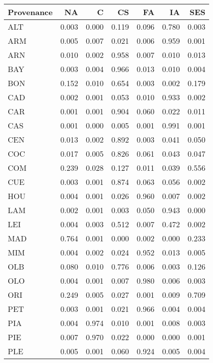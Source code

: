 \begin{table}[ht]
\centering
\begin{tabular}{lrrrrrr}
  \hline
Provenance & NA & C & CS & FA & IA & SES \\ 
  \hline
ALT & 0.003 & 0.000 & 0.119 & 0.096 & 0.780 & 0.003 \\ 
  ARM & 0.005 & 0.007 & 0.021 & 0.006 & 0.959 & 0.001 \\ 
  ARN & 0.010 & 0.002 & 0.958 & 0.007 & 0.010 & 0.013 \\ 
  BAY & 0.003 & 0.004 & 0.966 & 0.013 & 0.010 & 0.004 \\ 
  BON & 0.152 & 0.010 & 0.654 & 0.003 & 0.002 & 0.179 \\ 
  CAD & 0.002 & 0.001 & 0.053 & 0.010 & 0.933 & 0.002 \\ 
  CAR & 0.001 & 0.001 & 0.904 & 0.060 & 0.022 & 0.011 \\ 
  CAS & 0.001 & 0.000 & 0.005 & 0.001 & 0.991 & 0.001 \\ 
  CEN & 0.013 & 0.002 & 0.892 & 0.003 & 0.041 & 0.050 \\ 
  COC & 0.017 & 0.005 & 0.826 & 0.061 & 0.043 & 0.047 \\ 
  COM & 0.239 & 0.028 & 0.127 & 0.011 & 0.039 & 0.556 \\ 
  CUE & 0.003 & 0.001 & 0.874 & 0.063 & 0.056 & 0.002 \\ 
  HOU & 0.004 & 0.001 & 0.026 & 0.960 & 0.007 & 0.002 \\ 
  LAM & 0.002 & 0.001 & 0.003 & 0.050 & 0.943 & 0.000 \\ 
  LEI & 0.004 & 0.003 & 0.512 & 0.007 & 0.472 & 0.002 \\ 
  MAD & 0.764 & 0.001 & 0.000 & 0.002 & 0.000 & 0.233 \\ 
  MIM & 0.004 & 0.002 & 0.024 & 0.952 & 0.013 & 0.005 \\ 
  OLB & 0.080 & 0.010 & 0.776 & 0.006 & 0.003 & 0.126 \\ 
  OLO & 0.004 & 0.001 & 0.007 & 0.980 & 0.006 & 0.003 \\ 
  ORI & 0.249 & 0.005 & 0.027 & 0.001 & 0.009 & 0.709 \\ 
  PET & 0.003 & 0.001 & 0.021 & 0.966 & 0.004 & 0.004 \\ 
  PIA & 0.004 & 0.974 & 0.010 & 0.001 & 0.008 & 0.003 \\ 
  PIE & 0.007 & 0.970 & 0.022 & 0.000 & 0.000 & 0.001 \\ 
  PLE & 0.005 & 0.001 & 0.060 & 0.924 & 0.005 & 0.004 \\ 

\end{tabular}
\end{table}
